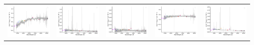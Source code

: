 \begin{center}
\begin{longtable}{l l l l l }
    \includegraphics[width=0.19\linewidth, clip]{Figs/Figs-sdss/spec-1101-52621-0223-SPLUS-s02s12-030410.pdf} & \includegraphics[width=0.19\linewidth, clip]{Figs/Figs-sdss/spec-1102-52883-0155-STRIPE82-0139-036676.pdf} & \includegraphics[width=0.19\linewidth, clip]{Figs/Figs-sdss/spec-1103-52873-0382-STRIPE82-0136-022276.pdf} & \includegraphics[width=0.19\linewidth, clip]{Figs/Figs-sdss/spec-1103-52873-0393-STRIPE82-0136-015923.pdf} & \includegraphics[width=0.19\linewidth, clip]{Figs/Figs-sdss/spec-1106-52912-0102-SPLUS-s02s05-046746.pdf} \\

\end{longtable}
\end{center}
